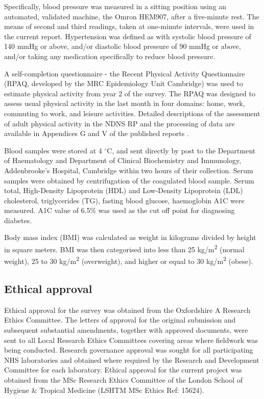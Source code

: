 Specifically, blood pressure was measured in a sitting position using an automated, validated machine, the Omron HEM907, after a five-minute rest. The means of second and third readings, taken at one-minute intervals, were used in the current report. Hypertension was defined as with systolic blood pressure of 140 mmHg or above, and/or diastolic blood pressure of 90 mmHg or above, and/or taking any medication specifically to reduce blood pressure. 

A self-completion questionnaire - the Recent Physical Activity Questionnaire  \parencite{besson2009estimating} (RPAQ, developed by the MRC Epidemiology Unit Cambridge) was used to estimate physical activity from year 2 of the survey. The RPAQ was designed to assess usual physical activity in the last month in four domains: home, work, commuting to work, and leisure activities. Detailed descriptions of the assessment of adult physical activity in the NDNS RP and the processing of data are available in Appendices G and V of the published reports \parencite{bates2014national,roberts2018national,NDNSofficial}. 

Blood samples were stored at 4 $^\circ$C, and sent directly by post to the Department of Haematology and Department of Clinical Biochemistry and Immunology, Addenbrooke's Hospital, Cambridge within two hours of their collection. Serum samples were obtained by centrifugation of the coagulated blood sample. Serum total, High-Density Lipoprotein (HDL) and Low-Density Lipoprotein (LDL) cholesterol, triglycerides (TG), fasting blood glucose, haemoglobin A1C were measured. A1C value of 6.5\% was used as the cut off point for diagnosing diabetes.

Body mass index (BMI) was calculated as weight in kilograms divided by height in square meters. BMI was then categorised into less than 25 kg/m\textsuperscript{2} (normal weight), 25 to 30 kg/m\textsuperscript{2} (overweight), and higher or equal to 30 kg/m\textsuperscript{2} (obese). 

\subsection{Ethical approval}\vspace{-0.3cm}

Ethical approval for the survey was obtained from the Oxfordshire A Research Ethics Committee. The letters of approval for the original submission and subsequent substantial amendments, together with approved documents, were sent to all Local Research Ethics Committees covering areas where fieldwork was being conducted. Research governance approval was sought for all participating NHS laboratories and obtained where required by the Research and Development Committee for each laboratory. Ethical approval for the current project was obtained from the MSc Research Ethics Committee of the London School of Hygiene \& Tropical Medicine (LSHTM MSc Ethics Ref: 15624). 


